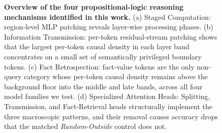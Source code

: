 \documentclass[11pt]{article}
\begin{document}
\begin{figure}[t]
    \vspace{-0.3em}
    \caption{\textbf{Overview of the four propositional-logic reasoning mechanisms identified in this work.} (a) Staged Computation: region-level MLP patching reveals layer-wise processing phases. (b) Information Transmission: per-token residual-stream patching shows that the largest per-token causal density in each layer band concentrates on a small set of semantically privileged boundary tokens. (c) Fact Retrospection: fact-value tokens are the only non-query category whose per-token causal density remains above the background floor into the middle and late bands, across all four model families we test. (d) Specialized Attention Heads: Splitting, Transmission, and Fact-Retrieval heads structurally implement the three macroscopic patterns, and their removal causes accuracy drops that the matched \textit{Random-Outside} control does not.}
    \vspace{-0.5em}
    \label{fig:overview}
\end{figure}

\end{document}

